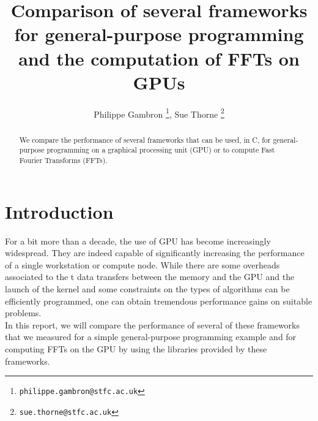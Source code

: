 \documentclass[12pt, a4paper]{article}
\date{}
\begin{document}
\title{Comparison of several frameworks for general-purpose programming and the  computation of FFTs on GPUs}
\author{Philippe Gambron \thanks{\texttt{philippe.gambron{@}stfc.ac.uk}}, Sue Thorne \thanks{\texttt{sue.thorne{@}stfc.ac.uk}}}
\maketitle
\begin{abstract}
We compare the performance of several frameworks that can be used, in C, for general-purpose programming on a graphical processing unit (GPU) or to compute Fast Fourier Transforms (FFTs).  
\end{abstract}
\section{Introduction}
For a bit more than a decade, the use of GPU has become increasingly widespread. They are indeed capable of significantly increasing the performance of a single workstation or compute node. While there are some overheads associated to the t data transfers between the memory and the GPU and the launch of the kernel and some constraints on the types of algorithms can be efficiently programmed, one can obtain tremendous performance gains on suitable problems.\\

In this report, we will compare the performance of several of these frameworks that we measured for a simple general-purpose programming example and for computing FFTs on the GPU by using the libraries provided by these frameworks. 
\end{document}
